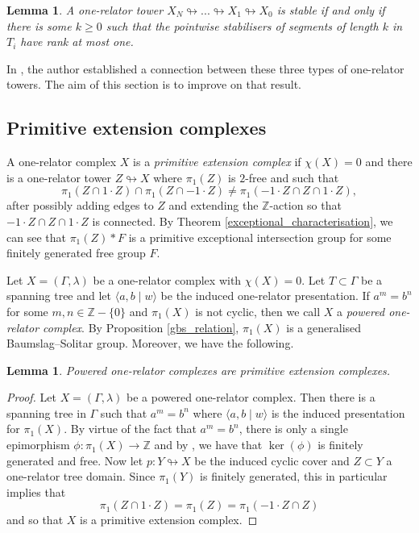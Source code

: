 \documentclass[11pt, a4paper]{amsart}
\newtheorem{lemma}[theorem]{Lemma}
\theoremstyle{definition}
\newcommand{\Z}{\mathbb{Z}}
\def\immerses{\looparrowright}
\begin{document}
\begin{lemma}
A one-relator tower $X_N\immerses...\immerses X_1\immerses X_0$ is stable if and only if there is some $k\geq 0$ such that the pointwise stabilisers of segments of length $k$ in $T_i$ have rank at most one.
\end{lemma}

In \cite{me_22}, the author established a connection between these three types of one-relator towers. The aim of this section is to improve on that result.



\subsection{Primitive extension complexes}

A one-relator complex $X$ is a \emph{primitive extension complex} if $\chi(X) = 0$ and there is a one-relator tower $Z\immerses X$ where $\pi_1(Z)$ is $2$-free and such that
\[
\pi_1(Z\cap 1\cdot Z)\cap \pi_1(Z\cap -1\cdot Z)\neq \pi_1(-1\cdot Z\cap Z\cap 1\cdot Z),
\]
after possibly adding edges to $Z$ and extending the $\Z$-action so that $-1\cdot Z\cap Z\cap 1\cdot Z$ is connected. By Theorem \ref{exceptional_characterisation}, we can see that $\pi_1(Z)*F$ is a primitive exceptional intersection group for some finitely generated free group $F$.


Let $X = (\Gamma, \lambda)$ be a one-relator complex with $\chi(X) = 0$. Let $T\subset \Gamma$ be a spanning tree and let $\langle a, b \mid w\rangle$ be the induced one-relator presentation. If $a^m = b^n$ for some $m, n\in \Z-\{0\}$ and $\pi_1(X)$ is not cyclic, then we call $X$ a \emph{powered one-relator complex}. By Proposition \ref{gbs_relation}, $\pi_1(X)$ is a generalised Baumslag--Solitar group. Moreover, we have the following.

\begin{lemma}
\label{powered_lemma}
Powered one-relator complexes are primitive extension complexes.
\end{lemma}

\begin{proof}
Let $X = (\Gamma, \lambda)$ be a powered one-relator complex. Then there is a spanning tree in $\Gamma$ such that $a^m = b^n$ where $\langle a, b\mid w\rangle$ is the induced presentation for $\pi_1(X)$. By virtue of the fact that $a^m = b^n$, there is only a single epimorphism $\phi:\pi_1(X)\to \Z$ and by \cite{murasugi_64}, we have that $\ker(\phi)$ is finitely generated and free. Now let $p:Y\immerses X$ be the induced cyclic cover and $Z\subset Y$ a one-relator tree domain. Since $\pi_1(Y)$ is finitely generated, this in particular implies that 
\[
\pi_1(Z\cap 1\cdot Z) = \pi_1(Z) = \pi_1(-1\cdot Z\cap Z)
\]
and so that $X$ is a primitive extension complex.
\end{proof}
\end{document}
